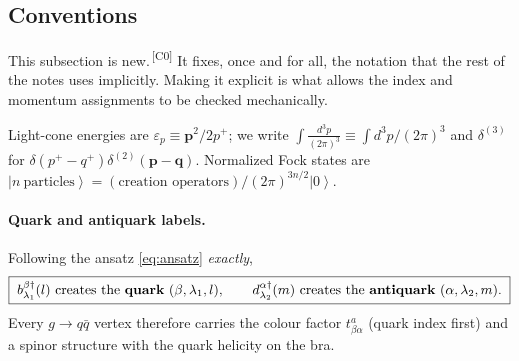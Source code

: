 \documentclass[11pt]{article}
\newcommand{\eps}{\varepsilon}
\newcommand{\dg}{\dagger}
\newcommand{\ip}[1]{\int\!\frac{d^{3}#1}{(2\pi)^{3}}}
\newcommand{\dthree}{\delta^{(3)}}
\newcommand{\ket}[1]{\left|#1\right\rangle}
\newcommand{\vac}{\ket{0}}
\newcommand{\chg}[1]{{\color{blue!70!black}\textsuperscript{\,[C#1]}}}
\begin{document}
\subsection{Conventions}
\label{sec:conv}

\begin{addbox}
This subsection is new.\chg{0} It fixes, once and for all, the notation that the rest of the
notes uses implicitly. Making it explicit is what allows the index and momentum assignments to be
checked mechanically.
\end{addbox}

Light-cone energies are $\eps_{p}\equiv\bm p^{2}/2p^{+}$; we write
$\ip{p}\equiv\int d^{3}p/(2\pi)^{3}$ and $\dthree$ for
$\delta(p^{+}-q^{+})\delta^{(2)}(\bm p-\bm q)$. Normalized Fock states are
$\ket{n\ \text{particles}}=(\text{creation operators})/(2\pi)^{3n/2}\vac$.

\paragraph{Quark and antiquark labels.} Following the ansatz \eqref{eq:ansatz} \emph{exactly},
\begin{equation}
\boxed{\;b^{\beta\dg}_{\lambda_{1}}(l)\ \text{creates the {\bf quark}}\ (\beta,\lambda_{1},l),
\qquad
d^{\alpha\dg}_{\lambda_{2}}(m)\ \text{creates the {\bf antiquark}}\ (\alpha,\lambda_{2},m).\;}
\label{eq:qlabels}
\end{equation}
Every $g\to q\bar q$ vertex therefore carries the colour factor $t^{a}_{\beta\alpha}$ (quark index
first) and a spinor structure with the quark helicity on the bra.
\end{document}
